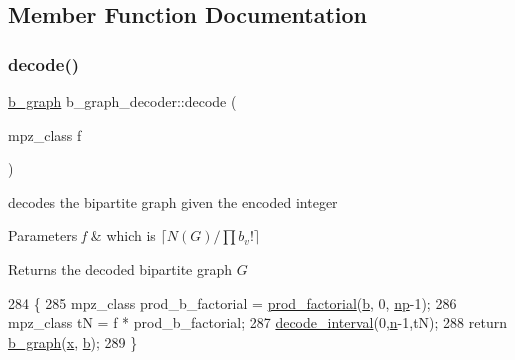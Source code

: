 \subsection{Member Function Documentation}
\mbox{\label{classb__graph__decoder_a81cffad95fa5a051fa4421b164f236a9}} 
\subsubsection{\texorpdfstring{decode()}{decode()}}
{\footnotesize\ttfamily \hyperlink{classb__graph}{b\+\_\+graph} b\+\_\+graph\+\_\+decoder\+::decode (\begin{DoxyParamCaption}\item[{mpz\+\_\+class}]{f }\end{DoxyParamCaption})}



decodes the bipartite graph given the encoded integer 


\begin{DoxyParams}{Parameters}
{\em f} & which is $\lceil N(G) / \prod b_v! \rceil$ \\
\hline
\end{DoxyParams}
\begin{DoxyReturn}{Returns}
the decoded bipartite graph $G$ 
\end{DoxyReturn}

\begin{DoxyCode}
284 \{
285   mpz\_class prod\_b\_factorial = \hyperlink{compression__helper_8cpp_a86d8a20e022dc06b23df3b08ac10b7d1}{prod\_factorial}(\hyperlink{classb__graph__decoder_a12d1a4a91f342111d2116196cb826317}{b}, 0, \hyperlink{classb__graph__decoder_a7eca48cf8793e722d1b29dbdc9fd2dca}{np}-1);
286   mpz\_class tN = f * prod\_b\_factorial;
287   \hyperlink{classb__graph__decoder_ae8b20698e015819cbdb8da7997888fd8}{decode\_interval}(0,\hyperlink{classb__graph__decoder_a2caddd63df6808c95e2ee738f7c77870}{n}-1,tN);
288   \textcolor{keywordflow}{return} \hyperlink{classb__graph}{b\_graph}(\hyperlink{classb__graph__decoder_a6bba2e67984f9733fc60c40dd4956587}{x}, \hyperlink{classb__graph__decoder_a12d1a4a91f342111d2116196cb826317}{b});
289 \}
\end{DoxyCode}
\mbox{\label{classb__graph__decoder_ae8b20698e015819cbdb8da7997888fd8}} 

